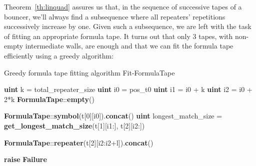 Theorem~\ref{th:linquad} assures us that, in the sequence of successive tapes of a bouncer, we'll always find a subsequence where all repeaters' repetitions successively increase by one. Given such a subsequence, we are left with the task of fitting an appropriate formula tape. It turns out that only 3 tapes, with non-empty intermediate walls, are enough and that we can fit the formula tape efficiently using a greedy algorithm:

\begin{algorithm}
    \caption{Greedy formula tape fitting algorithm {\sc Fit-FormulaTape}}\label{alg:greedy-formula-tape-fitting}
    \begin{algorithmic}[1]


        \State \textbf{uint} k = total\_repeater\_size
        \State \textbf{uint} i0 = pos\_t0
        \State \textbf{uint} i1 = i0 + k
        \State \textbf{uint} i2 = i0 + 2*k
        \State
        \State \Return \textbf{FormulaTape}::\textbf{empty}()

        \EndIf
        \State
        \State \Return \textbf{FormulaTape}::\textbf{symbol}(t[0][i0]).\textbf{concat}()
        \EndIf
        \State
        \State
        \textbf{uint} longest\_match\_size = \textbf{get\_longest\_match\_size}(t[1][i1:], t[2][i2:])
        \State

        \State \Return \textbf{FormulaTape}::\textbf{repeater}(t[2][i2:i2+l]).\textbf{concat}()
        \EndIf

        \EndFor
        \State
        \State \textbf{raise} \textbf{Failure}
        \EndProcedure
    \end{algorithmic}
\end{algorithm}

